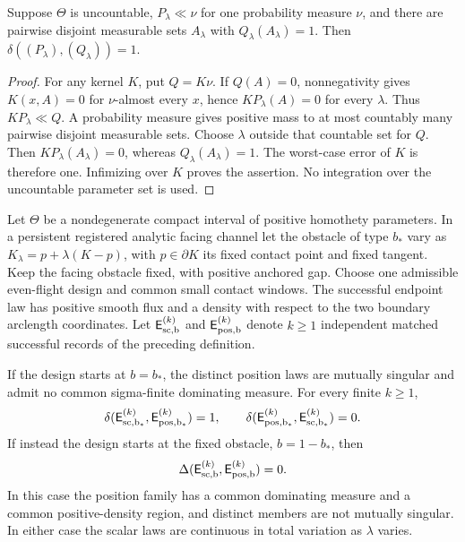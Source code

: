 \begin{lemma}
\label{lem:v27-dominated-disjoint}
Suppose \(\Theta\) is uncountable, \(P_\lambda\ll\nu\) for one probability
measure \(\nu\), and there are pairwise disjoint measurable sets \(A_\lambda\)
with \(Q_\lambda(A_\lambda)=1\).  Then
\(\delta((P_\lambda),(Q_\lambda))=1\).
\end{lemma}

\begin{proof}
For any kernel \(K\), put \(Q=K\nu\).  If \(Q(A)=0\), nonnegativity
gives \(K(x,A)=0\) for \(\nu\)-almost every \(x\), hence
\(KP_\lambda(A)=0\) for every \(\lambda\).  Thus \(KP_\lambda\ll Q\).
A probability measure gives positive mass to at most countably many
pairwise disjoint measurable sets.  Choose \(\lambda\) outside that
countable set for \(Q\).  Then \(KP_\lambda(A_\lambda)=0\), whereas
\(Q_\lambda(A_\lambda)=1\).  The worst-case error of \(K\) is therefore
one.  Infimizing over \(K\) proves the assertion.  No integration over the
uncountable parameter set is used.
\end{proof}

\begin{proposition}
\label{prop:v27-observed-type-dichotomy}
\label{prop:v26-position-deficiency}
Let \(\Theta\) be a nondegenerate compact interval of positive homothety
parameters.  In a persistent registered analytic facing channel let the
obstacle of type \(b_*\) vary as
\(K_\lambda=p+\lambda(K-p)\), with \(p\in\partial K\) its fixed contact
point and fixed tangent.  Keep the facing obstacle fixed, with positive
anchored gap.  Choose one admissible even-flight design and common small
contact windows.  The successful endpoint law has positive smooth flux
and a density with respect to the two boundary arclength coordinates.
Let \(\mathsf E_{\rm sc,b}^{(k)}\) and
\(\mathsf E_{\rm pos,b}^{(k)}\) denote \(k\ge1\) independent matched
successful records of the preceding definition.

If the design starts at \(b=b_*\), the distinct position laws are mutually
singular and admit no common sigma-finite dominating measure.  For every
finite \(k\ge1\),
\begin{equation}\label{eq:v26-position-deficiency}
 \delta(\mathsf E_{\rm sc,b_*}^{(k)},\mathsf E_{\rm pos,b_*}^{(k)})=1,
 \qquad
 \delta(\mathsf E_{\rm pos,b_*}^{(k)},\mathsf E_{\rm sc,b_*}^{(k)})=0.
\end{equation}
If instead the design starts at the fixed obstacle, \(b=1-b_*\), then
\begin{equation}\label{eq:v27-fixed-type-equivalence}
        \Delta(\mathsf E_{\rm sc,b}^{(k)},\mathsf E_{\rm pos,b}^{(k)})=0.
\end{equation}
In this case the position family has a common dominating measure and a
common positive-density region, and distinct members are not mutually
singular.  In either case the scalar laws are continuous in total variation
as \(\lambda\) varies.
\end{proposition}

